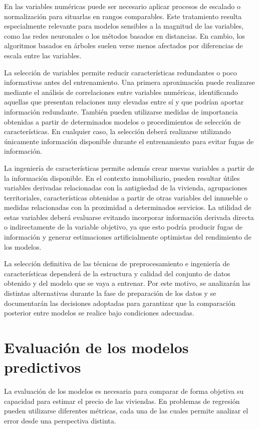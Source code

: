 \documentclass[IB]{TFUOC}%
\begin{document}
En las variables numéricas puede ser necesario aplicar procesos de escalado o normalización para situarlas en rangos comparables. Este tratamiento resulta especialmente relevante para modelos sensibles a la magnitud de las variables, como las redes neuronales o los métodos basados en distancias. En cambio, los algoritmos basados en árboles suelen verse menos afectados por diferencias de escala entre las variables.

La selección de variables permite reducir características redundantes o poco informativas antes del entrenamiento. Una primera aproximación puede realizarse mediante el análisis de correlaciones entre variables numéricas, identificando aquellas que presentan relaciones muy elevadas entre sí y que podrían aportar información redundante. También pueden utilizarse medidas de importancia obtenidas a partir de determinados modelos o procedimientos de selección de características. En cualquier caso, la selección deberá realizarse utilizando únicamente información disponible durante el entrenamiento para evitar fugas de información.

La ingeniería de características permite además crear nuevas variables a partir de la información disponible. En el contexto inmobiliario, pueden resultar útiles variables derivadas relacionadas con la antigüedad de la vivienda, agrupaciones territoriales, características obtenidas a partir de otras variables del inmueble o medidas relacionadas con la proximidad a determinados servicios. La utilidad de estas variables deberá evaluarse evitando incorporar información derivada directa o indirectamente de la variable objetivo, ya que esto podría producir fugas de información y generar estimaciones artificialmente optimistas del rendimiento de los modelos.

La selección definitiva de las técnicas de preprocesamiento e ingeniería de características dependerá de la estructura y calidad del conjunto de datos obtenido y del modelo que se vaya a entrenar. Por este motivo, se analizarán las distintas alternativas durante la fase de preparación de los datos y se documentarán las decisiones adoptadas para garantizar que la comparación posterior entre modelos se realice bajo condiciones adecuadas.

\section{Evaluación de los modelos predictivos}

La evaluación de los modelos es necesaria para comparar de forma objetiva su capacidad para estimar el precio de las viviendas. En problemas de regresión pueden utilizarse diferentes métricas, cada una de las cuales permite analizar el error desde una perspectiva distinta.
\end{document}
